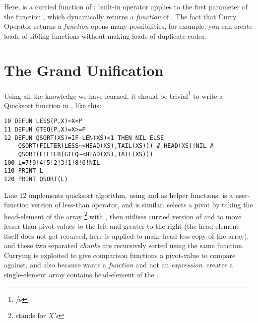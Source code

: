 Here,  is a curried function of ; built-in operator \code{$\sim\!<$} applies  to the first parameter of the function , which dynamically returns a \emph{function} of . The fact that Curry Operator returns a \emph{function} opens many possibilities, for example, you can create loads of sibling functions without making loads of duplicate codes.

\section[Wrapping-Up]{The Grand Unification}

Using all the knowledge we have learned, it should be trivial\footnote{/s} to write a Quicksort function in \tbas, like this:

\begin{lstlisting}
10 DEFUN LESS(P,X)=X<P
11 DEFUN GTEQ(P,X)=X>=P
12 DEFUN QSORT(XS)=IF LEN(XS)<1 THEN NIL ELSE 
    QSORT(FILTER(LESS~<HEAD(XS),TAIL(XS))) # HEAD(XS)!NIL # 
    QSORT(FILTER(GTEQ~<HEAD(XS),TAIL(XS)))
100 L=7!9!4!5!2!3!1!8!6!NIL
110 PRINT L
120 PRINT QSORT(L)
\end{lstlisting}

Line 12 implements quicksort algorithm, using  and  as helper functions.  is a user-function version of less-than operator, and  is similar.  selects a pivot by taking the head-element of the array \footnote{stands for \emph{X's}} with , then utilises curried version of  and  to move lesser-than-pivot values to the left and greater to the right (the head element itself does not get recursed, here  is applied to make head-less copy of the array), and these two separated \emph{chunks} are recursively sorted using the same  function. Currying is exploited to give comparison functions a pivot-value to compare against, and also because  wants a \emph{function} and not an \emph{expression}.  creates a single-element array contains head-element of the .

